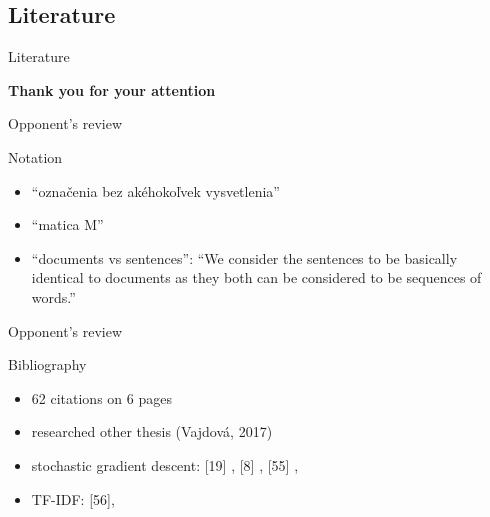 \documentclass[xcolor={table}]{beamer}
\begin{document}
\subsection{Literature}                
\begin{frame}[allowframebreaks]{Literature}
\footnotesize
    \nocite{*}
    
     
\end{frame}

\begin{frame}
    \vfill
    \begin{center}
        \huge\bfseries
        Thank you for your attention
        \vfill
    \end{center}
    \vfill
\end{frame}

\appendix



\begin{frame}{Opponent's review}
    \begin{block}{Notation}
        \begin{itemize}   
            \item ``označenia bez akéhokoľvek vysvetlenia''
            \item ``matica M'' %
            \item ``documents vs sentences'': ``We consider the sentences to be basically identical to documents as they both
can be considered to be sequences of words.''        
             
        \end{itemize}
    \end{block}
\end{frame} 

\begin{frame}{Opponent's review}
    \begin{block}{Bibliography}
        \begin{itemize}   
            \item 62 citations on 6 pages
            \item researched other thesis (Vajdová, 2017)
            \item stochastic gradient descent: [19] \cite{Goodfellow-et-al-2016},  [8] \cite{bottou-bousquet-2008},
            [55] \cite{rumelhart1986david},  %
            \item TF-IDF: [56], \cite{salton1988term}
        \end{itemize}
    \end{block}
\end{frame} 
\end{document}
